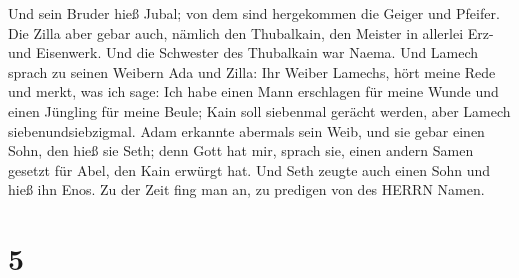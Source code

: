  Und sein Bruder hieß Jubal; von dem sind hergekommen die
Geiger und Pfeifer.  Die Zilla aber gebar auch, nämlich den
Thubalkain, den Meister in allerlei Erz-und Eisenwerk. Und die Schwester
des Thubalkain war Naema.  Und Lamech sprach zu seinen
Weibern Ada und Zilla: Ihr Weiber Lamechs, hört meine Rede und merkt,
was ich sage: Ich habe einen Mann erschlagen für meine Wunde und einen
Jüngling für meine Beule;  Kain soll siebenmal gerächt
werden, aber Lamech siebenundsiebzigmal.  Adam erkannte
abermals sein Weib, und sie gebar einen Sohn, den hieß sie Seth; denn
Gott hat mir, sprach sie, einen andern Samen gesetzt für Abel, den Kain
erwürgt hat.  Und Seth zeugte auch einen Sohn und hieß ihn
Enos. Zu der Zeit fing man an, zu predigen von des HERRN Namen.

\hypertarget{section-4}{%
\section{5}\label{section-4}}

